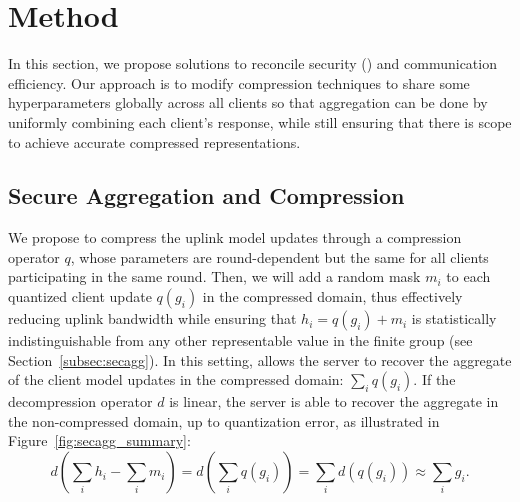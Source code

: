 \section{Method}
\label{sec:method}

In this section, we propose solutions to
reconcile security (\SecAgg) and communication efficiency.
Our approach is to modify compression techniques to share some hyperparameters globally across all clients so that aggregation can be done by uniformly combining each client's response, while still ensuring that there is scope to achieve accurate compressed representations.

\subsection{Secure Aggregation and Compression}
\label{subsec:secagg_comp}
We propose to compress the uplink model updates through a compression operator $q$, whose parameters are round-dependent but the same for all clients participating in the same round.
Then, we will add a random mask $m_i$ to each quantized client update $q(g_i)$ in the compressed domain, thus effectively reducing uplink bandwidth while ensuring that $h_i = q(g_i) + m_i$ is statistically indistinguishable from any other representable value in the finite group (see Section~\ref{subsec:secagg}).
In this setting, \SecAgg allows the server to recover the aggregate of the client model updates in the compressed domain: $\sum_i q(g_i)$.
If the decompression operator $d$ is linear, the server is able to recover the aggregate in the non-compressed domain, up to quantization error, as illustrated in Figure~\ref{fig:secagg_summary}:
\begin{equation*}\textstyle
    d\left(\sum_i h_i - \sum_i m_i\right) = d\left(\sum_i q(g_i)\right) =\sum_i d(q(g_i)) \approx \sum_i g_i.
\end{equation*}
